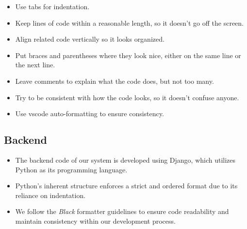 \documentclass[12pt]{article}
\begin{document}
\begin{itemize}
    \item Use tabs for indentation.
    \item Keep lines of code within a reasonable length, so it doesn't go off the screen.
    \item Align related code vertically so it looks organized.
    \item Put braces and parentheses where they look nice, either on the same line or the next line.
    \item Leave comments to explain what the code does, but not too many.
    \item Try to be consistent with how the code looks, so it doesn't confuse anyone.
    \item Use vscode auto-formatting to ensure consistency.
  \end{itemize}

\subsection{Backend}
\begin{itemize}
    \item The backend code of our system is developed using Django, which utilizes Python as its programming language.
    \item Python's inherent structure enforces a strict and ordered format due to its reliance on indentation.
    \item We follow the \textit{Black} formatter guidelines to ensure code readability and maintain consistency within our development process.
    \end{itemize}
\end{document}
